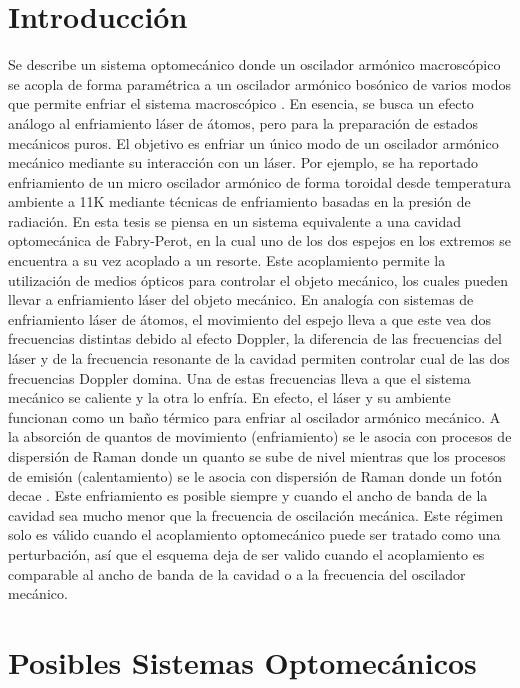 \documentclass[a4paper,10pt]{report}
\begin{document}
\section{Introducción}

Se describe un sistema optomecánico donde un oscilador armónico macroscópico se acopla de forma paramétrica a un oscilador armónico bosónico de varios modos que permite enfriar el sistema macroscópico \cite{NooshiLC}. En esencia, se busca un efecto análogo al enfriamiento láser de átomos, pero para la preparación de estados mecánicos puros. El objetivo es enfriar un único modo de un oscilador armónico mecánico mediante su interacción con un láser. Por ejemplo, se ha reportado enfriamiento de un micro oscilador armónico de forma toroidal desde temperatura ambiente a 11K mediante técnicas de enfriamiento basadas en la presión de radiación\cite{SchliesserRPC}. En esta tesis se piensa en un sistema equivalente a una cavidad optomecánica de Fabry-Perot, en la cual uno de los dos espejos en los extremos se encuentra a su vez acoplado a un resorte. Este acoplamiento permite la utilización de medios ópticos para controlar el objeto mecánico, los cuales pueden llevar a enfriamiento láser del objeto mecánico\cite{NooshiLC}. En analogía con sistemas de enfriamiento láser de átomos, el movimiento del espejo lleva a que este vea dos frecuencias distintas debido al efecto Doppler\cite{KippenberCO}, la diferencia de las frecuencias del láser y de la frecuencia resonante de la cavidad permiten controlar cual de las dos frecuencias Doppler domina. Una de estas frecuencias lleva a que el sistema mecánico se caliente y la otra lo enfría. En efecto, el láser y su ambiente funcionan como un baño térmico para enfriar al oscilador armónico mecánico. A la absorción de quantos de movimiento (enfriamiento) se le asocia con procesos de dispersión de Raman donde un quanto se sube de nivel mientras que los procesos de emisión (calentamiento) se le asocia con dispersión de Raman donde un fotón decae \cite{LCNooshi}. Este enfriamiento es posible siempre y cuando el ancho de banda de la cavidad sea mucho menor que la frecuencia de oscilación mecánica. \cite{LCNooshi} \cite{MarquardtSC} Este régimen solo es válido cuando el acoplamiento optomecánico puede ser tratado como una perturbación, así que el esquema deja de ser valido cuando el acoplamiento es comparable al ancho de banda de la cavidad o a la frecuencia del oscilador mecánico.

\section{Posibles Sistemas Optomecánicos}
\end{document}
